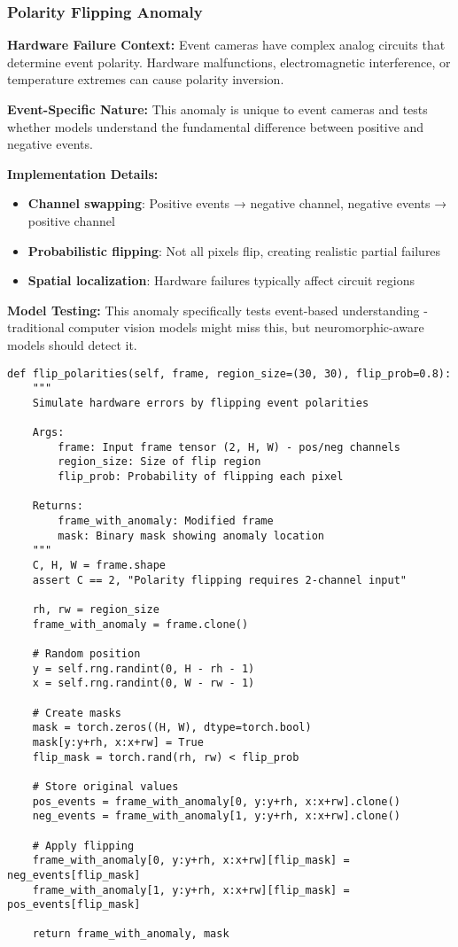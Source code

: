 \documentclass[12pt,a4paper]{article}
\begin{document}
\subsubsection{Polarity Flipping Anomaly}

\textbf{Hardware Failure Context:} Event cameras have complex analog circuits that determine event polarity. Hardware malfunctions, electromagnetic interference, or temperature extremes can cause polarity inversion.

\textbf{Event-Specific Nature:} This anomaly is unique to event cameras and tests whether models understand the fundamental difference between positive and negative events.

\textbf{Implementation Details:}
\begin{itemize}
    \item \textbf{Channel swapping}: Positive events → negative channel, negative events → positive channel
    \item \textbf{Probabilistic flipping}: Not all pixels flip, creating realistic partial failures
    \item \textbf{Spatial localization}: Hardware failures typically affect circuit regions
\end{itemize}

\textbf{Model Testing:} This anomaly specifically tests event-based understanding - traditional computer vision models might miss this, but neuromorphic-aware models should detect it.

\begin{lstlisting}[caption={Polarity Flipping Implementation - Simulating Circuit Malfunctions}]
def flip_polarities(self, frame, region_size=(30, 30), flip_prob=0.8):
    """
    Simulate hardware errors by flipping event polarities
    
    Args:
        frame: Input frame tensor (2, H, W) - pos/neg channels
        region_size: Size of flip region
        flip_prob: Probability of flipping each pixel
    
    Returns:
        frame_with_anomaly: Modified frame
        mask: Binary mask showing anomaly location
    """
    C, H, W = frame.shape
    assert C == 2, "Polarity flipping requires 2-channel input"
    
    rh, rw = region_size
    frame_with_anomaly = frame.clone()
    
    # Random position
    y = self.rng.randint(0, H - rh - 1)
    x = self.rng.randint(0, W - rw - 1)
    
    # Create masks
    mask = torch.zeros((H, W), dtype=torch.bool)
    mask[y:y+rh, x:x+rw] = True
    flip_mask = torch.rand(rh, rw) < flip_prob
    
    # Store original values
    pos_events = frame_with_anomaly[0, y:y+rh, x:x+rw].clone()
    neg_events = frame_with_anomaly[1, y:y+rh, x:x+rw].clone()
    
    # Apply flipping
    frame_with_anomaly[0, y:y+rh, x:x+rw][flip_mask] = neg_events[flip_mask]
    frame_with_anomaly[1, y:y+rh, x:x+rw][flip_mask] = pos_events[flip_mask]
    
    return frame_with_anomaly, mask
\end{lstlisting}
\end{document}
